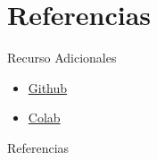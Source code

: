 \documentclass{beamer}
\begin{document}
\section{Referencias}
\begin{frame}{Recurso Adicionales}
    \begin{itemize}
        \item \href{https://github.com/Baran-phys/DynamicFormer}{Github}
        \item \href{https://colab.research.google.com/drive/1VblCUmNt6fUqZW52dbGjnfKx41Q4ywGO?usp=sharing}{Colab}
    \end{itemize}
\end{frame}

\begin{frame}{Referencias}
     
    
\end{frame}
    
\end{document}
